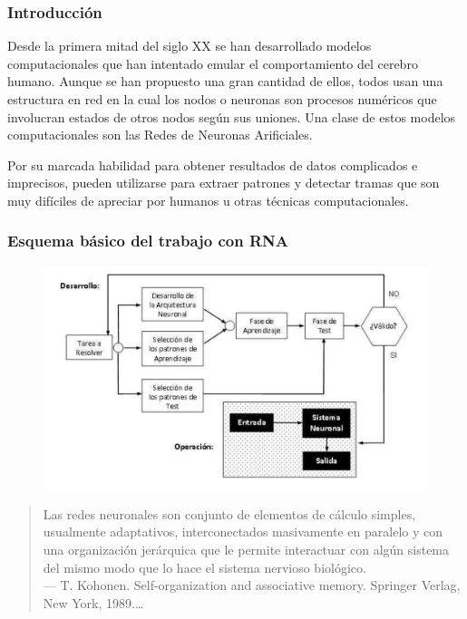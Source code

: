 \documentclass[
	11pt, %
]{beamer}
\begin{document}

\begin{frame}
  \frametitle{Introducción}

  Desde la primera mitad del siglo XX se han desarrollado modelos computacionales que han intentado emular el comportamiento del cerebro humano. Aunque se han propuesto una gran cantidad de ellos, todos usan una estructura en red en la cual los nodos o neuronas son procesos numéricos que involucran estados de otros nodos según sus uniones. Una clase de estos modelos computacionales son las Redes de Neuronas Arificiales.

  \bigskip %
  
  Por su marcada habilidad para obtener resultados de datos complicados e imprecisos, pueden utilizarse para extraer patrones y detectar tramas que son muy difíciles de apreciar por humanos u otras técnicas computacionales.
  
\end{frame}

\begin{frame}
  \frametitle{Esquema básico del trabajo con RNA}
  
  \begin{figure}
    \includegraphics[width=0.8\linewidth]{rna_.png}
  \end{figure}
\end{frame}

\begin{frame}
  
  \begin{quote}
    Las redes neuronales son conjunto de elementos de cálculo simples, usualmente adaptativos, interconectados masivamente en paralelo y con una organización jerárquica que le permite interactuar con algún sistema del mismo modo que lo hace el sistema nervioso biológico.\\
    \bigskip %
    --- T. Kohonen. Self-organization and associative memory. Springer Verlag, New York, 1989.\ldots
  \end{quote}
  
  \bigskip %
    
\end{frame}
\end{document}
